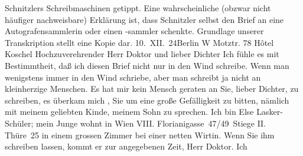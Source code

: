 \begin{ledgroupsized}[t]{13cm}
{                                 Schnitzlers Schreibmaschinen getippt. Eine wahrscheinliche (obzwar
                                 nicht häufiger nachweisbare) Erklärung ist, dass Schnitzler selbst den Brief an
                                 eine Autografensammlerin oder einen -sammler schenkte. Grundlage
                                 unserer Transkription stellt eine Kopie dar. }
\toendnotes[C]{\smallbreak}\pstart
           \noindent{}10. XII. 24\hfill Berlin W Motztr. 78\pend
           \pstart
           \raggedleft{}Hôtel Koschel\pend
           \pstart\center{}Hochzuverehrender Herr Doktor und lieber Dichter\pend\pstart
           Ich fühle es mit Bestimmtheit, daß ich diesen Brief nicht nur in \introOben{}den\introOben{} Wind schreibe. Wenn man wenigstens immer in den Wind schriebe, aber man
               schreibt ja nicht an kleinherzige Menschen. Es hat mir kein Mensch geraten an Sie,
               lieber Dichter, zu schreiben, es überkam mich \strikeout{\textcolor{gray}{×}}, Sie um eine große Gefälligkeit zu bitten, nämlich mit {\pb}meinem geliebten
                  Kinde, meinem Sohn zu sprechen. Ich bin
               Else Lasker-Schüler; mein Junge wohnt in Wien \introOben{}VIII.\introOben{} Florianigasse 47/49 Stiege II. \introOben{}Thüre 25\introOben{} in einem grossen Zimmer bei einer netten Wirtin. Wenn Sie ihm schreiben lassen, kommt er zur angegebenen Zeit, Herr Doktor. Ich

\end{ledgroupsized}
